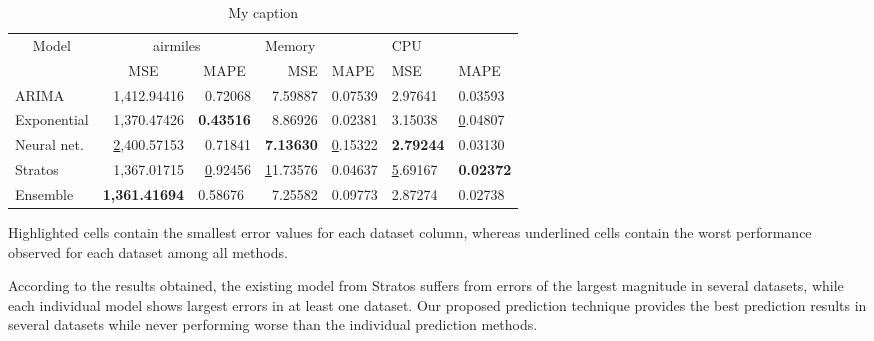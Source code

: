 \begin{table}[]
\centering
\caption{My caption}
\label{my-label}
\begin{tabular}{|l|r|r|r|l|l|l|}
\hline
\multicolumn{1}{|c|}{\multirow{2}{*}{Model}} & \multicolumn{2}{c|}{airmiles}                                            & \multicolumn{2}{l|}{Memory}      & \multicolumn{2}{l|}{CPU}            \\ \cline{2-7} 
\multicolumn{1}{|c|}{}                       & \multicolumn{1}{c|}{MSE}                  & \multicolumn{1}{c|}{MAPE}    & MSE              & MAPE          & MSE              & MAPE             \\ \hline
ARIMA                                        & 1,412.94416                               & 0.72068                      & 7.59887          & 0.07539       & 2.97641          & 0.03593          \\ \hline
Exponential                                  & 1,370.47426                               & \textbf{0.43516}             & 8.86926          & 0.02381       & 3.15038          & {\ul 0.04807}    \\ \hline
Neural net.                                  & {\ul 2,400.57153}                         & 0.71841                      & \textbf{7.13630} & {\ul 0.15322} & \textbf{2.79244} & 0.03130          \\ \hline
Stratos                                      & 1,367.01715                               & {\ul 0.92456}                & {\ul 11.73576}   & 0.04637       & {\ul 5.69167}    & \textbf{0.02372} \\ \hline
Ensemble                                     & \multicolumn{1}{l|}{\textbf{1,361.41694}} & \multicolumn{1}{l|}{0.58676} & 7.25582          & 0.09773       & 2.87274          & 0.02738          \\ \hline
\end{tabular}
\end{table}

Highlighted cells contain the smallest error values for each dataset column, whereas underlined cells contain the worst performance observed for each dataset among all methods. 

According to the results obtained, the existing model from Stratos suffers from errors of the largest magnitude in several datasets, while each individual model shows largest errors in at least one dataset. Our proposed prediction technique provides the best prediction results in several datasets while never performing worse than the individual prediction methods.